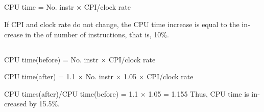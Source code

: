 \documentclass[11pt]{article}
\begin{document}
\subsection{}
\begin{latin}
\indent \indent CPU time = No. instr × CPI/clock rate

If CPI and clock rate do not change, the CPU time increase is equal to the increase in the of number of instructions, that is, 10\%.
\end{latin}

\subsection{}
\begin{latin}
\indent \indent CPU time(before) = No. instr $\times$ CPI/clock rate

CPU time(after) = 1.1 $\times$ No. instr $\times$ 1.05 $\times$ CPI/clock rate

CPU times(after)/CPU time(before) = 1.1 $\times$ 1.05 = 1.155 Thus, CPU time is
increased by 15.5\%.
\end{latin}
\end{document}
